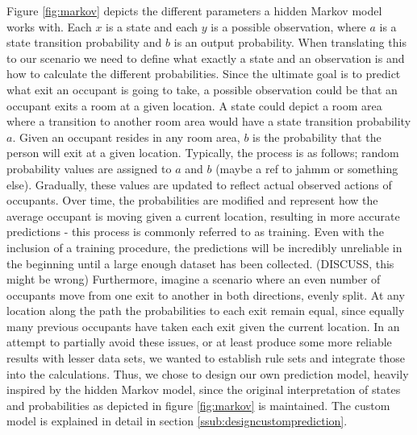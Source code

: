 Figure \ref{fig:markov} depicts the different parameters a hidden Markov model works with. Each \(x\) is a state and each \(y\) is a possible observation, where \(a\) is a state transition probability and \(b\) is an output probability. When translating this to our scenario we need to define what exactly a state and an observation is and how to calculate the different probabilities. Since the ultimate goal is to predict what exit an occupant is going to take, a possible observation could be that an occupant exits a room at a given location. A state could depict a room area where a transition to another room area would have a state transition probability \(a\). Given an occupant resides in any room area, \(b\) is the probability that the person will exit at a given location. Typically, the process is as follows; random probability values are assigned to \(a\) and \(b\) (maybe a ref to jahmm or something else). Gradually, these values are updated to reflect actual observed actions of occupants. Over time, the probabilities are modified and represent how the average occupant is moving given a current location, resulting in more accurate predictions - this process is commonly referred to as training. Even with the inclusion of a training procedure, the predictions will be incredibly unreliable in the beginning until a large enough dataset has been collected. (DISCUSS, this might be wrong) Furthermore, imagine a scenario where an even number of occupants move from one exit to another in both directions, evenly split. At any location along the path the probabilities to each exit remain equal, since equally many previous occupants have taken each exit given the current location. In an attempt to partially avoid these issues, or at least produce some more reliable results with lesser data sets, we wanted to establish rule sets and integrate those into the calculations. Thus, we chose to design our own prediction model, heavily inspired by the hidden Markov model, since the original interpretation of states and probabilities as depicted in figure \ref{fig:markov} is maintained. The custom model is explained in detail in section \ref{ssub:designcustomprediction}. 